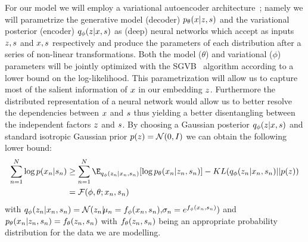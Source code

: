 For our model we will employ a variational autoencoder architecture~\citep{kingma2013auto,rezende2014stochastic}; namely we will parametrize the generative model (decoder) $p_\theta(\*x|\*z,\*s)$ and  the variational posterior (encoder) $q_\phi(\*z|\*x,\*s)$ as (deep) neural networks which accept as inputs $\*z,\*s$ and $\*x,\*s$ respectively and produce the parameters of each distribution after a series of non-linear transformations. Both the model ($\theta$) and variational ($\phi$) parameters will be jointly optimized with the SGVB~\citep{kingma2013auto} algorithm according to a lower bound on the log-likelihood. This parametrization will allow us to capture most of the salient information of $\*x$ in our embedding $\*z$. Furthermore the distributed representation of a neural network would allow us to better resolve the dependencies between $\*x$ and $\*s$ thus yielding a better disentangling between the independent factors $\*z$ and $\*s$. By choosing a Gaussian posterior $q_\phi(\*z|\*x, \*s)$ and standard isotropic Gaussian prior $p(\*z) = \mathcal{N}(\*0, \*I)$ we can obtain the following lower bound:
\begin{align}
	\sum_{n=1}^{N}\log p(\*x_n|\*s_n) & \ge  \sum_{n=1}^{N}\E_{q_\phi(\*z_n|\*x_n,\*s_n)}[\log p_\theta(\*x_n|\*z_n,\*s_n)] - KL(q_\phi(\*z_n|\*x_n,\*s_n) || p(\*z))\\
	                    & = \mathcal{F}(\phi, \theta; \*x_n, \*s_n) \nonumber
\end{align}
with $q_\phi(\*z_n|\*x_n, \*s_n) = \mathcal{N}(\*z_n|\!\mu_n = f_\phi(\*x_n, \*s_n), \!\sigma_n = e^{f_\phi(\*x_n, \*s_n)})$ and $p_\theta(\*x_n|\*z_n, \*s_n) = f_\theta(\*z_n, \*s_n)$ with $f_\theta(\*z_n, \*s_n)$ being an appropriate probability distribution for the data we are modelling.

